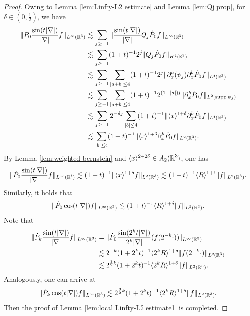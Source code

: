 \documentclass[11pt,twoside]{article}
\def\R{\mathop{\mathbb R\kern 0pt}\nolimits}
\def\f{\frac}
\def\p{\partial}
\def\ls{\lesssim}
\newcommand{\w}[1]{\langle {#1} \rangle}
\DeclareMathOperator{\supp}{supp}
\theoremstyle{plain}
\theoremstyle{definition}
\numberwithin{equation}{section}
\begin{document}
	\begin{proof}
		Owing to Lemma \ref{lem:Linfty-L2 estimate} and Lemma \ref{lem:Qj prop}, for $\delta\in(0,\f12)$, we have
		\begin{equation*}
			\begin{split}
				\|\dot{P}_0\f{\sin(t|\nabla|)}{|\nabla|}f\|_{L^\infty(\R^3)}
				&\ls \sum_{j\ge -1} \|\f{\sin(t|\nabla|)}{|\nabla|}Q_j \dot{P}_0f\|_{L^\infty(\R^3)} \\
				&\ls \sum_{j\ge -1} (1+t)^{-1} 2^j \|Q_j \dot{P}_0f\|_{H^4(\R^3)}\\
				&\ls \sum_{j\ge -1} \sum_{|a+b|\le 4}(1+t)^{-1} 2^j \|\p_x^a(\psi_j) \p_x^b\dot{P}_0f\|_{L^2(\R^3)}\\
				&\ls \sum_{j\ge -1} \sum_{|a+b|\le 4}(1+t)^{-1} 2^{(1-|a|)j} \|\p_x^b\dot{P}_0f\|_{L^2(\supp \psi_j)}\\
				&\ls \sum_{j\ge -1} 2^{-\delta j} \sum_{|b|\le 4}(1+t)^{-1} \|\w{x}^{1+\delta}\p_x^b\dot{P}_0f\|_{L^2(\R^3)}\\
				&\ls \sum_{|b|\le 4}(1+t)^{-1} \|\w{x}^{1+\delta}\p_x^b\dot{P}_0f\|_{L^2(\R^3)}.\\
			\end{split}
		\end{equation*}
		By Lemma \ref{lem:weighted bernstein} and $\w{x}^{2+2\delta}\in A_2(\R^3)$, one has
		\begin{equation*}
			\|\dot{P}_0\f{\sin(t|\nabla|)}{|\nabla|}f\|_{L^\infty(\R^3)}
			\ls
			(1+t)^{-1} \|\w{x}^{1+\delta}f\|_{L^2(\R^3)}
			\ls (1+t)^{-1} \w{R}^{1+\delta}\|f\|_{L^2(\R^3)}.
		\end{equation*}
		Similarly, it holds that
		\begin{equation*}
			\|\dot{P}_0\cos(t|\nabla|)f\|_{L^\infty(\R^3)}
			\ls (1+t)^{-1} \w{R}^{1+\delta}\|f\|_{L^2(\R^3)}.
		\end{equation*}
		Note that
		\begin{equation*}
			\begin{split}
				\|\dot{P}_k\f{\sin(t|\nabla|)}{|\nabla|}f\|_{L^\infty(\R^3)}
				&=\|\dot{P}_0\f{\sin(2^kt|\nabla|)}{2^k|\nabla|}(f(2^{-k}\cdot))\|_{L^\infty(\R^3)} \\
				&\ls 2^{-k}(1+2^kt)^{-1} \w{2^k R}^{1+\delta}\|f(2^{-k}\cdot)\|_{L^2(\R^3)}\\
				&\ls 2^{\f12k}(1+2^kt)^{-1} \w{2^k R}^{1+\delta}\|f\|_{L^2(\R^3)}.
			\end{split}
		\end{equation*}
		Analogously, one can arrive at
		\begin{equation*}
			\|\dot{P}_k\cos(t|\nabla|)f\|_{L^\infty(\R^3)}
			\ls 2^{\f32k}(1+2^kt)^{-1} \w{2^k R}^{1+\delta}\|f\|_{L^2(\R^3)}.
		\end{equation*}
		Then the proof of Lemma \ref{lem:local Linfty-L2 estimate1} is completed.
	\end{proof}
\end{document}
